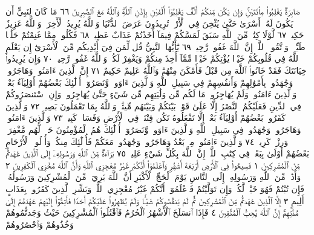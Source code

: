 صَابِرَةࣱ يَغْلِبُوا۟ مِا۟ئَتَيْنِۚ وَإِن يَكُن مِّنكُمْ أَلْفࣱ يَغْلِبُوٓا۟
أَلْفَيْنِ بِإِذْنِ ٱللَّهِۗ وَٱللَّهُ مَعَ ٱلصَّٰبِرِينَ ٦٦ مَا كَانَ لِنَبِيٍّ
أَن يَكُونَ لَهُۥٓ أَسْرَىٰ حَتَّىٰ يُثْخِنَ فِي ٱلْأَرْضِۚ تُرِيدُونَ عَرَضَ
ٱلدُّنْيَا وَٱللَّهُ يُرِيدُ ٱلْأٓخِرَةَۗ وَٱللَّهُ عَزِيزٌ حَكِيمࣱ ٦٧ لَّوْلَا كِتَٰبࣱ
مِّنَ ٱللَّهِ سَبَقَ لَمَسَّكُمْ فِيمَآ أَخَذْتُمْ عَذَابٌ عَظِيمࣱ ٦٨ فَكُلُوا۟
مِمَّا غَنِمْتُمْ حَلَٰلࣰا طَيِّبࣰاۚ وَٱتَّقُوا۟ ٱللَّهَۚ إِنَّ ٱللَّهَ غَفُورࣱ رَّحِيمࣱ ٦٩
يَٰٓأَيُّهَا ٱلنَّبِيُّ قُل لِّمَن فِيٓ أَيْدِيكُم مِّنَ ٱلْأَسْرَىٰٓ إِن يَعْلَمِ ٱللَّهُ
فِي قُلُوبِكُمْ خَيْرࣰا يُؤْتِكُمْ خَيْرࣰا مِّمَّآ أُخِذَ مِنكُمْ وَيَغْفِرْ لَكُمْۚ
وَٱللَّهُ غَفُورࣱ رَّحِيمࣱ ٧٠ وَإِن يُرِيدُوا۟ خِيَانَتَكَ فَقَدْ خَانُوا۟ ٱللَّهَ
مِن قَبْلُ فَأَمْكَنَ مِنْهُمْۗ وَٱللَّهُ عَلِيمٌ حَكِيمٌ ٧١ إِنَّ ٱلَّذِينَ
ءَامَنُوا۟ وَهَاجَرُوا۟ وَجَٰهَدُوا۟ بِأَمْوَٰلِهِمْ وَأَنفُسِهِمْ فِي سَبِيلِ
ٱللَّهِ وَٱلَّذِينَ ءَاوَوا۟ وَّنَصَرُوٓا۟ أُو۟لَٰٓئِكَ بَعْضُهُمْ أَوْلِيَآءُ بَعْضࣲۚ وَٱلَّذِينَ
ءَامَنُوا۟ وَلَمْ يُهَاجِرُوا۟ مَا لَكُم مِّن وَلَٰيَتِهِم مِّن شَيْءٍ حَتَّىٰ يُهَاجِرُوا۟ۚ
وَإِنِ ٱسْتَنصَرُوكُمْ فِي ٱلدِّينِ فَعَلَيْكُمُ ٱلنَّصْرُ إِلَّا عَلَىٰ قَوْمِۭ
بَيْنَكُمْ وَبَيْنَهُم مِّيثَٰقࣱۗ وَٱللَّهُ بِمَا تَعْمَلُونَ بَصِيرࣱ ٧٢ وَٱلَّذِينَ
كَفَرُوا۟ بَعْضُهُمْ أَوْلِيَآءُ بَعْضٍۚ إِلَّا تَفْعَلُوهُ تَكُن فِتْنَةࣱ فِي
ٱلْأَرْضِ وَفَسَادࣱ كَبِيرࣱ ٧٣ وَٱلَّذِينَ ءَامَنُوا۟ وَهَاجَرُوا۟ وَجَٰهَدُوا۟
فِي سَبِيلِ ٱللَّهِ وَٱلَّذِينَ ءَاوَوا۟ وَّنَصَرُوٓا۟ أُو۟لَٰٓئِكَ هُمُ ٱلْمُؤْمِنُونَ
حَقࣰّاۚ لَّهُم مَّغْفِرَةࣱ وَرِزْقࣱ كَرِيمࣱ ٧٤ وَٱلَّذِينَ ءَامَنُوا۟ مِنۢ بَعْدُ
وَهَاجَرُوا۟ وَجَٰهَدُوا۟ مَعَكُمْ فَأُو۟لَٰٓئِكَ مِنكُمْۚ وَأُو۟لُوا۟ ٱلْأَرْحَامِ
بَعْضُهُمْ أَوْلَىٰ بِبَعْضࣲ فِي كِتَٰبِ ٱللَّهِۚ إِنَّ ٱللَّهَ بِكُلِّ شَيْءٍ عَلِيمُۢ ٧٥
بَرَآءَةࣱ مِّنَ ٱللَّهِ وَرَسُولِهِۦٓ إِلَى ٱلَّذِينَ عَٰهَدتُّم مِّنَ ٱلْمُشْرِكِينَ ١
فَسِيحُوا۟ فِي ٱلْأَرْضِ أَرْبَعَةَ أَشْهُرࣲ وَٱعْلَمُوٓا۟ أَنَّكُمْ غَيْرُ مُعْجِزِي
ٱللَّهِ وَأَنَّ ٱللَّهَ مُخْزِي ٱلْكَٰفِرِينَ ٢ وَأَذَٰنࣱ مِّنَ ٱللَّهِ وَرَسُولِهِۦٓ
إِلَى ٱلنَّاسِ يَوْمَ ٱلْحَجِّ ٱلْأَكْبَرِ أَنَّ ٱللَّهَ بَرِيٓءࣱ مِّنَ ٱلْمُشْرِكِينَ
وَرَسُولُهُۥۚ فَإِن تُبْتُمْ فَهُوَ خَيْرࣱ لَّكُمْۖ وَإِن تَوَلَّيْتُمْ فَٱعْلَمُوٓا۟
أَنَّكُمْ غَيْرُ مُعْجِزِي ٱللَّهِۗ وَبَشِّرِ ٱلَّذِينَ كَفَرُوا۟ بِعَذَابٍ أَلِيمٍ ٣
إِلَّا ٱلَّذِينَ عَٰهَدتُّم مِّنَ ٱلْمُشْرِكِينَ ثُمَّ لَمْ يَنقُصُوكُمْ شَيْـࣰٔا
وَلَمْ يُظَٰهِرُوا۟ عَلَيْكُمْ أَحَدࣰا فَأَتِمُّوٓا۟ إِلَيْهِمْ عَهْدَهُمْ إِلَىٰ مُدَّتِهِمْۚ
إِنَّ ٱللَّهَ يُحِبُّ ٱلْمُتَّقِينَ ٤ فَإِذَا ٱنسَلَخَ ٱلْأَشْهُرُ ٱلْحُرُمُ
فَٱقْتُلُوا۟ ٱلْمُشْرِكِينَ حَيْثُ وَجَدتُّمُوهُمْ وَخُذُوهُمْ وَٱحْصُرُوهُمْ

